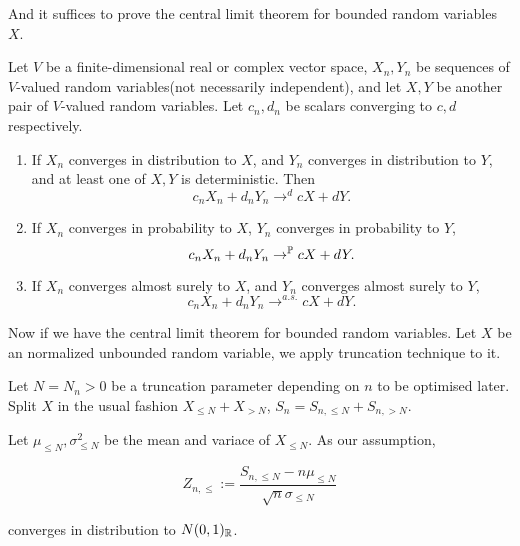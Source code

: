 And it suffices to prove the central limit theorem for bounded random variables $X$. 

\begin{lemma}
    Let $V$ be a finite-dimensional real or complex vector space, $X_n, Y_n$ be sequences of $V$-valued random variables(not necessarily independent), and let $X,Y$ be another pair of $V$-valued random variables. 
    Let $c_n,d_n$ be scalars converging to $c,d$ respectively.
    \begin{enumerate}
        \item If $X_n$ converges in distribution to $X$, and $Y_n$ converges in distribution to $Y$, and at least one of $X,Y$ is deterministic. Then
        \begin{equation*}
            c_n X_n +d_nY_n \to^d cX+dY.
        \end{equation*}
        \item If $X_n$ converges in probability to $X$, $Y_n$ converges in probability to $Y$,
        \begin{equation*}
            c_n X_n+d_nY_n \to^{\mathbb{P}} cX+dY.
        \end{equation*}
        \item If $X_n$ converges almost surely to $X$, and $Y_n$ converges almost surely to $Y$,
        \begin{equation*}
            c_n X_n+d_nY_n \to^{a.s.} cX+dY.
        \end{equation*}
    \end{enumerate}
\end{lemma}

Now if we have the central limit theorem for bounded random variables. Let $X$ be an normalized unbounded random variable, we apply truncation technique to it.

\newcommand{\truncation}[2]{#1_{\leq #2}}

Let $N=N_n>0$ be a truncation parameter depending on $n$ to be optimised later. Split $X$ in the usual fashion $X_{\leq N}+X_{>N}$, $S_n = S_{n,\leq N}+S_{n, >N}$.

Let $\mu_{\leq N},\sigma^2_{\leq N}$ be the mean and variace of $X_{\leq N}$. As our assumption,

\begin{equation*}
    Z_{n,\leq} := \frac{S_{n,\leq N}-n\truncation{\mu}{N}}{\sqrt{n}\truncation{\sigma}{N}}
\end{equation*}

converges in distribution to $N(0,1)_{\mathbb{R}}$. 

